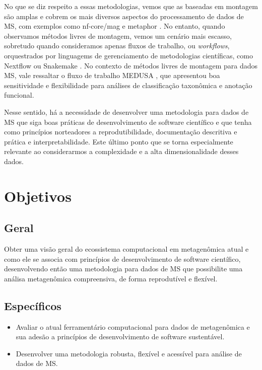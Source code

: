 \documentclass[
	12pt,				%
	oneside,			%
	a4paper,			%
	chapter=TITLE,		%
	section=TITLE,		%
	english,			%
	brazil				%
	]{abntex2}
\begin{document}
No que se diz respeito a essas metodologias, vemos que as baseadas em montagem são amplas e cobrem os mais diversos aspectos do processamento de dados de \gls{MS}, com exemplos como nf-core/mag \autocite{krakau2022} e metaphor \autocite{salazar2023}. No entanto, quando observamos métodos livres de montagem, vemos um cenário mais escasso, sobretudo quando consideramos apenas fluxos de trabalho, ou \emph{workflows}, orquestrados por linguagems de gerenciamento de metodologias científicas, como Nextflow \autocite{ditommaso2017} ou Snakemake \autocite{mölder2021}. No contexto de métodos livres de montagem para dados \gls{MS}, vale ressaltar o fluxo de trabalho MEDUSA \autocite{morais2022}, que apresentou boa sensitividade e flexibilidade para análises de classificação taxonômica e anotação funcional.

Nesse sentido, há a necessidade de desenvolver uma metodologia para dados de \gls{MS} que siga boas práticas de desenvolvimento de software científico e que tenha como princípios norteadores a reprodutibilidade, documentação descritiva e prática e interpretabilidade. Este último ponto que se torna especialmente relevante ao considerarmos a complexidade e a alta dimensionalidade desses dados.

\chapter{Objetivos}\label{obj}

\section{Geral}\label{geral}

Obter uma visão geral do ecossistema computacional em metagenômica atual e como ele se associa
com princípios de desenvolvimento de software científico, desenvolvendo então uma metodologia
para dados de \gls{MS} que possibilite uma análisa metagenômica compreensiva, de forma reprodutível e flexível.

\section{Específicos}\label{especuxedficos}
\begin{itemize}
\tightlist
\item
  Avaliar o atual ferramentário computacional para dados de metagenômica e sua adesão a princípios de desenvolvimento de software sustentável.
\item
  Desenvolver uma metodologia robusta, flexível e acessível para análise de dados de \gls{MS}.
\end{itemize}
\end{document}
